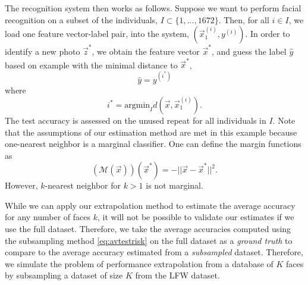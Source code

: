 \documentclass[12pt]{article}
\begin{document}
The recognition system then works as follows.  Suppose we want to
perform facial recognition on a subset of the individuals, $I \subset
\{1,\hdots, 1672\}$.  Then, for all $i \in I$, we load one feature
vector-label pair, into the system, $(\vec{x}_1^{(i)}, y^{(i)})$.  In
order to identify a new photo $\vec{z}^*$, we obtain the feature
vector $\vec{x}^*$, and guess the label $\hat{y}$ based on example
with the minimal distance to $\vec{x}^*$,
\[
\hat{y} = y^{(i^*)}
\]
where
\[
i^* = \text{argmin}_I d(\vec{x}, \vec{x}_1^{(i)}).
\]
The test accuracy is assessed on the unused repeat for all individuals
in $I$.  Note that the assumptions of our estimation method are met in
this example because one-nearest neighbor is a marginal classifier.
One can define the margin functions as
\[
(\mathcal{M}(\vec{x}))(\vec{x}^*) = -||\vec{x} - \vec{x}^*||^2.
\]
However, $k$-nearest neighbor for $k > 1$ is not marginal.

While we can apply our extrapolation method to estimate the average
accuracy for any number of faces $k$, it will not be possible to
validate our estimates if we use the full dataset.  Therefore, we take
the average accuracies computed using the subsampling method
\eqref{eq:avtestrisk} on the full dataset as a \emph{ground truth} to
compare to the average accuracy estimated from a \emph{subsampled}
dataset.  Therefore, we simulate the problem of performance
extrapolation from a database of $K$ faces by subsampling a
dataset of size $K$ from the LFW dataset.
\end{document}
